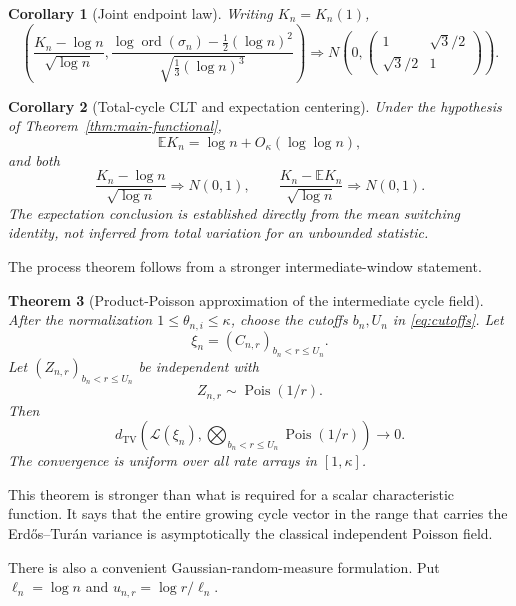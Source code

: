 \documentclass[11pt]{article}
\newtheorem{theorem}{Theorem}[section]
\newtheorem{corollary}[theorem]{Corollary}
\theoremstyle{definition}
\theoremstyle{remark}
\newcommand{\Ee}{\mathbb E}
\newcommand{\Pois}{\operatorname{Pois}}
\newcommand{\ord}{\operatorname{ord}}
\newcommand{\TV}{\mathrm{TV}}
\newcommand{\cL}{\mathcal L}
\begin{document}
\begin{corollary}[Joint endpoint law]
\label{cor:endpoint-joint}
Writing $K_n=K_n(1)$,
\begin{equation}\label{eq:endpoint-joint}
 \boxed{
 \left(
 \frac{K_n-\log n}{\sqrt{\log n}},
 \frac{\log\ord(\sigma_n)-\frac12(\log n)^2}
      {\sqrt{\frac13(\log n)^3}}
 \right)
 \Rightarrow
 N\!\left(0,
 \begin{pmatrix}
 1&\sqrt3/2\\[1mm]
 \sqrt3/2&1
 \end{pmatrix}\right).}
\end{equation}
\end{corollary}

\begin{corollary}[Total-cycle CLT and expectation centering]
\label{cor:total-cycle-clt}
Under the hypothesis of Theorem~\ref{thm:main-functional},
\[
 \Ee K_n=\log n+O_\kappa(\log\log n),
\]
and both
\[
 \frac{K_n-\log n}{\sqrt{\log n}}\Rightarrow N(0,1),
 \qquad
 \frac{K_n-\Ee K_n}{\sqrt{\log n}}\Rightarrow N(0,1).
\]
The expectation conclusion is established directly from the mean switching
identity, not inferred from total variation for an unbounded statistic.
\end{corollary}

The process theorem follows from a stronger intermediate-window statement.

\begin{theorem}[Product-Poisson approximation of the intermediate cycle field]
\label{thm:TV-main}
After the normalization $1\le\theta_{n,i}\le\kappa$, choose the cutoffs
$b_n,U_n$ in \eqref{eq:cutoffs}.  Let
\[
 \xi_n=(C_{n,r})_{b_n<r\le U_n}.
\]
Let $(Z_{n,r})_{b_n<r\le U_n}$ be independent with
\[
 Z_{n,r}\sim\Pois(1/r).
\]
Then
\begin{equation}\label{eq:TV-main}
 \boxed{
 d_{\TV}\left(
 \cL(\xi_n),
 \bigotimes_{b_n<r\le U_n}\Pois(1/r)
 \right)\longrightarrow0.}
\end{equation}
The convergence is uniform over all rate arrays in $[1,\kappa]$.
\end{theorem}

This theorem is stronger than what is required for a scalar characteristic
function.  It says that the entire growing cycle vector in the range that
carries the Erd\H{o}s--Tur\'an variance is asymptotically the classical
independent Poisson field.

There is also a convenient Gaussian-random-measure formulation.  Put
$\ell_n=\log n$ and $u_{n,r}=\log r/\ell_n$.
\end{document}
